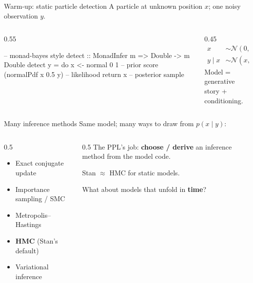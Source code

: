 \begin{frame}[fragile]{Warm-up: static particle detection}
  A particle at unknown position $x$; one noisy observation $y$.
  \vspace{0.4em}
  \begin{columns}[T]
    \begin{column}{0.55\textwidth}
\begin{semiverbatim}
-- monad-bayes style
detect :: MonadInfer m => Double -> m Double
detect y = do
  x <- normal 0 1           -- prior
  score (normalPdf x 0.5 y) -- likelihood
  return x                  -- posterior sample
\end{semiverbatim}
    \end{column}
    \begin{column}{0.45\textwidth}
      \[
        \begin{aligned}
          x &\sim \mathcal{N}(0,1) \\
          y \mid x &\sim \mathcal{N}(x, 0.5^2)
        \end{aligned}
      \]
      \vspace{0.3em}
      {\small Model = generative story + conditioning.}
    \end{column}
  \end{columns}
\end{frame}

\begin{frame}{Many inference methods}
  Same model; many ways to draw from $p(x\mid y)$:
  \begin{columns}[T]
    \begin{column}{0.5\textwidth}
      \begin{itemize}\setlength\itemsep{0.25em}
        \item Exact conjugate update
        \item Importance sampling / SMC
        \item Metropolis--Hastings
        \item \textbf{HMC} (Stan's default)
        \item Variational inference
      \end{itemize}
    \end{column}
    \begin{column}{0.5\textwidth}
      The PPL's job: \textbf{choose / derive} an
      inference method from the model code.

      \vspace{0.6em}
      {\small Stan $\approx$ HMC for static models.}

      \vspace{0.4em}
      {\small What about models that unfold in \textbf{time}?}
    \end{column}
  \end{columns}
\end{frame}

